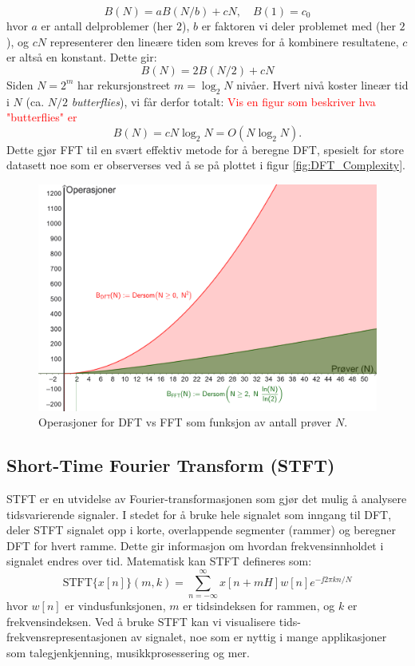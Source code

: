 \[
    B(N) = aB(N/b) + cN, \quad B(1) = c_0
\]
hvor $a$ er antall delproblemer (her $2$), $b$ er faktoren vi deler problemet med (her $2$), og $cN$ representerer den lineære tiden som kreves for å kombinere resultatene, $c$ er altså en konstant. Dette gir:
\[
    B(N) = 2B(N/2) + cN
\]
Siden $N=2^m$ har rekursjonstreet $m=\log_2 N$ nivåer. Hvert nivå koster lineær tid i $N$ (ca. $N/2$ \emph{butterflies}), vi får derfor totalt:
\textcolor{red}{Vis en figur som beskriver hva "butterflies" er}
\[
    B(N)=cN\log_2 N=O(N\log_2 N).
\]
Dette gjør FFT til en svært effektiv metode for å beregne DFT, spesielt for store datasett noe som er observerses ved å se på plottet i figur \ref{fig:DFT_Complexity}.
\begin{figure}[h]
    \centering
    \includegraphics[width=.9\textwidth]{./Media/DFT_Complexity_VS_FFT.png}
    \caption{Operasjoner for DFT vs FFT som funksjon av antall prøver $N$.}
    \label{fig:FFT_Complexity}
\end{figure}
\clearpage 
\noindent
\subsection{Short-Time Fourier Transform (STFT)}
STFT er en utvidelse av Fourier-transformasjonen som gjør det mulig å analysere tidsvarierende signaler. I stedet for å bruke hele signalet som inngang til DFT, deler STFT signalet opp i korte, overlappende segmenter (rammer) og beregner DFT for hvert ramme. Dette gir informasjon om hvordan frekvensinnholdet i signalet endres over tid. Matematisk kan STFT defineres som:
\[
    \text{STFT}\{x[n]\}(m, k) = \sum_{n=-\infty}^{\infty} x[n+mH] w[n] e^{-\jj 2 \pi k n / N}
\]
hvor \(w[n]\) er vindusfunksjonen, \(m\) er tidsindeksen for rammen, og \(k\) er frekvensindeksen. Ved å bruke STFT kan vi visualisere tids-frekvensrepresentasjonen av signalet, noe som er nyttig i mange applikasjoner som talegjenkjenning, musikkprosessering og mer.

